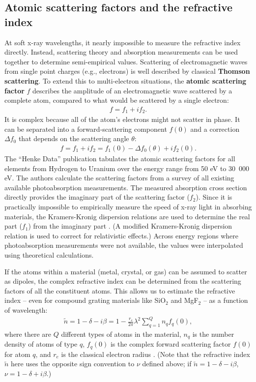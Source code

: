 \subsection{Atomic scattering factors and the refractive index}
\label{secHenke}
At soft x-ray wavelengths, it nearly impossible to measure the refractive index directly.  Instead, scattering theory and absorption measurements can be used together to determine semi-empirical values.  Scattering of electromagnetic waves from single point charges (e.g., electrons) is well described by classical \textbf{Thomson scattering}.  To extend this to multi-electron situations, the \textbf{atomic scattering factor} $f$ describes the amplitude of an electromagnetic wave scattered by a complete atom, compared to what would be scattered by a single electron:
\begin{align}
f = f_1 + i f_2.
\end{align}
It is complex because all of the atom's electrons might not scatter in phase.  It can be separated into a forward-scattering component $f(0)$ and a correction $\Delta f_0$ that depends on the scattering angle $\theta$:
\begin{align}
f = f_1 + i f_2 = f_1(0) - \Delta f_0(\theta) + i f_2(0).
\end{align}
The ``Henke Data'' publication \cite{Hen93} tabulates the atomic scattering factors for all elements from Hydrogen to Uranium over the energy range from 50 eV to 30~000 eV.  The authors calculate the scattering factors from a survey of all existing available photoabsorption measurements.  The measured absorption cross section directly provides the imaginary part of the scattering factor ($f_2$).  Since it is practically impossible to empirically measure the speed of x-ray light in absorbing materials, the Kramers-Kronig dispersion relations are used to determine the real part ($f_1$) from the imaginary part \cite{Kro26}.  (A modified Kramers-Kronig dispersion relation is used to correct for relativistic effects.)  Across energy regions where photoabsorption measurements were not available, the values were interpolated using theoretical calculations.

If the atoms within a material (metal, crystal, or gas) can be assumed to scatter as dipoles, the complex refractive index can be determined from the scattering factors of all the constituent atoms. This allows us to estimate the refractive index -- even for compound grating materials like SiO$_2$ and MgF$_2$ -- as a function of wavelength:
\begin{align}
\tilde n = 1 - \delta - i \beta = 1 - \frac{r_e}{2\pi} \lambda ^2 \sum\limits_{q=1}^Q n_q f_q(0),
\label{nFromScatteringFactor}
\end{align}
where there are $Q$ different types of atoms in the material, $n_q$ is the number density of atoms of type $q$, $f_q(0)$ is the complex forward scattering factor $f(0)$ for atom $q$, and $r_e$ is the classical electron radius \cite{Hen93}.    (Note that the refractive index $\tilde n$ here uses the opposite sign convention to $\nu$ defined above; if $\tilde n = 1 - \delta - i \beta$,  $\nu = 1 - \delta + i \beta$.)

